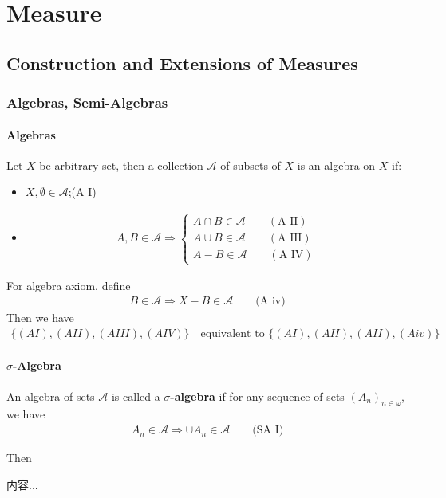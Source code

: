 \documentclass[Total.tex]{subfiles}
\begin{document}
	\chapter{Measure}
		\section{Construction and Extensions of Measures}
			\subsection{Algebras, Semi-Algebras}
				\subsubsection{Algebras}
					\begin{Def}
						Let $X$ be arbitrary set, then a collection $\mathcal{A}$ of subsets of $X$ is an algebra on $X$ if:
						\begin{itemize}
							\item $X,\emptyset\in \mathcal{A}$;(A I)
							\item \begin{gather*}
								A,B\in \mathcal{A}\Rightarrow \begin{cases}
									A\cap B\in \mathcal{A}\qquad (\mbox{A II})\\
									A\cup B\in \mathcal{A}\qquad(\mbox{A III})\\
									A-B\in \mathcal{A}\qquad (\mbox{A IV})
								\end{cases}
							\end{gather*}
						\end{itemize}
					\end{Def}
					
					\begin{proposition}
						For algebra axiom, define
						\begin{gather*}
						 	B\in \mathcal{A}\Rightarrow X-B\in \mathcal{A}\qquad\mbox{(A iv)}
						\end{gather*}
						Then we have
						\begin{gather*}
							\{(AI),(AII),(AIII),(AIV)\}\quad\mbox{equivalent to }\{(AI),(AII),(AII),(Aiv)\}
						\end{gather*}
					\end{proposition}
				\subsubsection{$\sigma$-Algebra}
					\begin{Def}
						An algebra of sets $\mathcal{A}$ is called a \textbf{$\sigma$-algebra} if for any sequence of sets $(A_n)_{n\in \omega}$, we have
						\begin{gather*}
							A_n\in \mathcal{A}\Rightarrow \cup A_n\in \mathcal{A}\qquad \mbox{(SA I)}
						\end{gather*}
					\end{Def}
					Then
					\begin{Def}
						内容...
					\end{Def}
\end{document}

